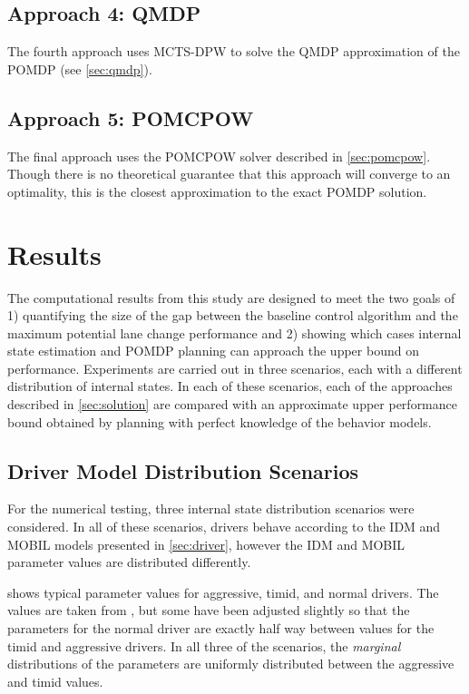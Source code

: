 \subsection{Approach 4: QMDP}

The fourth approach uses MCTS-DPW to solve the QMDP approximation of the POMDP (see \cref{sec:qmdp}).

\subsection{Approach 5: POMCPOW}

The final approach uses the POMCPOW solver described in \cref{sec:pomcpow}.
Though there is no theoretical guarantee that this approach will converge to an optimality, this is the closest approximation to the exact POMDP solution.

\section{Results}

The computational results from this study are designed to meet the two goals of 1) quantifying the size of the gap between the baseline control algorithm and the maximum potential lane change performance and 2) showing which cases internal state estimation and POMDP planning can approach the upper bound on performance.
Experiments are carried out in three scenarios, each with a different distribution of internal states.
In each of these scenarios, each of the approaches described in \cref{sec:solution} are compared with an approximate upper performance bound obtained by planning with perfect knowledge of the behavior models.

\subsection{Driver Model Distribution Scenarios} \label{sec:dist}

For the numerical testing, three internal state distribution scenarios were considered.
In all of these scenarios, drivers behave according to the IDM and MOBIL models presented in \cref{sec:driver}, however the IDM and MOBIL parameter values are distributed differently.

 shows typical parameter values for aggressive, timid, and normal drivers.
The values are taken from \citet{kesting2009agents}, but some have been adjusted slightly so that the parameters for the normal driver are exactly half way between values for the timid and aggressive drivers.
In all three of the scenarios, the \emph{marginal} distributions of the parameters are uniformly distributed between the aggressive and timid values.

